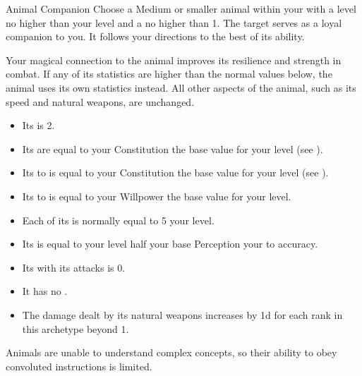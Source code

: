         \begin{attuneability}{Animal Companion}
            \rankline
            Choose a Medium or smaller animal  within your  with a level no higher than your level and a  no higher than 1.
            The target serves as a loyal companion to you.
            It follows your directions to the best of its ability.

            Your magical connection to the animal improves its resilience and strength in combat.
            If any of its statistics are higher than the normal values below, the animal uses its own statistics instead.
            All other aspects of the animal, such as its speed and natural weapons, are unchanged.
            \begin{itemize}
                \item Its  is 2.
                \item Its  are equal to your Constitution \add the base value for your level (see ).
                \item Its  to  is equal to your Constitution \add the base value for your level (see ).
                \item Its  to  is equal to your Willpower \add the base value for your level.
                \item Each of its  is normally equal to 5 \add your level.
                \item Its  is equal to your level \add half your base Perception \add your  to accuracy.
                \item Its  with its attacks is 0.
                \item It has no .
                \item The damage dealt by its natural weapons increases by \plus1d for each rank in this archetype beyond 1.
            \end{itemize}

            Animals are unable to understand complex concepts, so their ability to obey convoluted instructions is limited.
        \end{attuneability}

